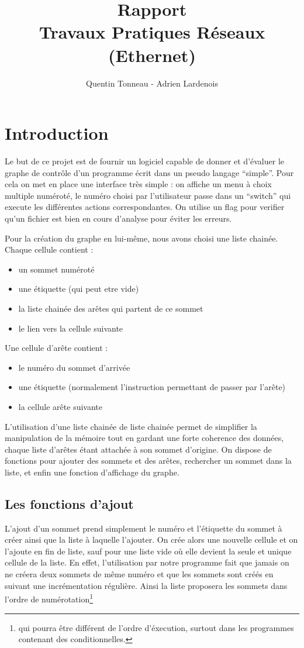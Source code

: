 \documentclass[a4paper,11pt]{article}
\title {Rapport \\ Travaux Pratiques Réseaux (Ethernet)}
\author {Quentin Tonneau - Adrien Lardenois}
\date{}
\begin{document}
	\maketitle %
	\tableofcontents %
	\newpage %
	
	
	\section{Introduction}
	Le but de ce projet est de fournir un logiciel capable de donner et d'évaluer le graphe de contrôle d'un programme écrit dans un pseudo langage ``simple''. Pour cela on met en place une interface très simple : on affiche un menu à choix multiple numéroté, le numéro choisi par l'utilisateur passe dans un ``switch'' qui execute les différentes actions correspondantes. On utilise un flag pour verifier qu'un fichier est bien en cours d'analyse pour éviter les erreurs.

	Pour la création du graphe en lui-même, nous avons  choisi une liste chainée. Chaque cellule contient :
	\begin{itemize}
		\item un sommet numéroté
		\item une étiquette (qui peut etre vide)
		\item la liste chainée des arêtes qui partent de ce sommet
		\item le lien vers la cellule suivante
	\end{itemize}
	Une cellule d'arête contient : 
	\begin{itemize}
		\item le numéro du sommet d'arrivée 
		\item une étiquette (normalement l'instruction permettant de passer par l'arête)
		\item la cellule arête suivante
	\end{itemize}
	
	L'utilisation d'une liste chainée de liste chainée permet de simplifier la manipulation de la mémoire tout en gardant une forte coherence des données, chaque liste d'arêtes étant attachée à son sommet d'origine. On dispose de fonctions pour ajouter des sommets et des arêtes, rechercher un sommet dans la liste, et enfin une fonction d'affichage du graphe.
	\subsection{Les fonctions d'ajout}
		L'ajout d'un sommet prend simplement le numéro et l'étiquette du sommet à créer ainsi que la liste à laquelle l'ajouter. On crée alors une nouvelle cellule et on l'ajoute en fin de liste, sauf pour une liste vide où elle devient la seule et unique cellule de la liste. En effet, l'utilisation par notre programme fait que jamais on ne créera deux sommets de même numéro et que les sommets sont créés en suivant une incrémentation régulière. Ainsi la liste proposera les sommets dans l'ordre de numérotation\footnote{qui pourra être différent de l'ordre d'éxecution, surtout dans les programmes contenant des conditionnelles.}
\end{document}
